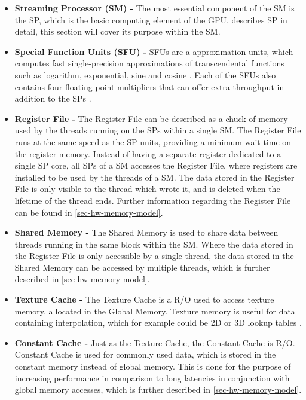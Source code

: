 \begin{itemize}
	\item \textbf{Streaming Processor (SM) -}  The most essential component of the SM is the SP, which is the basic computing element of the GPU.
	 describes SP in detail, this section will cover its purpose within the SM.
	
	\item \textbf{Special Function Units (SFU) -} SFUs are a approximation units, which computes fast single-precision approximations of transcendental functions such as logarithm, exponential, sine and cosine \cite{Wilt2013}.
	Each of the SFUs also contains four floating-point multipliers that can offer extra throughput in addition to the SPs \cite{Li2016}.
	
	\item \textbf{Register File -} The Register File can be described as a chuck of memory used by the threads running on the SPs within a single SM. 
	The Register File runs at the same speed as the SP units, providing a minimum wait time on the register memory. 
	Instead of having a separate register dedicated to a single SP core, all SPs of a SM accesses the Register File, where registers are installed to be used by the threads of a SM.
	The data stored in the Register File is only visible to the thread which wrote it, and is deleted when the lifetime of the thread ends.
	Further information regarding the Register File can be found in \cref{sec-hw-memory-model}.
	
	\item \textbf{Shared Memory -} The Shared Memory is used to share data between threads running in the same block within the SM.
	Where the data stored in the Register File is only accessible by a single thread, the data stored in the Shared Memory can be accessed by multiple threads, which is further described in \cref{sec-hw-memory-model}.
		
	\item \textbf{Texture Cache -} The Texture Cache is a R/O used to access texture memory, allocated in the Global Memory.
	Texture memory is useful for data containing interpolation, which for example could be 2D or 3D lookup tables \cite{Cook2008}.
	
	\item \textbf{Constant Cache -} Just as the Texture Cache, the Constant Cache is R/O.
	Constant Cache is used for commonly used data, which is stored in the constant memory instead of global memory.
	This is done for the purpose of increasing performance in comparison to long latencies in conjunction with global memory accesses, which is further described in \cref{sec-hw-memory-model}.
	

\end{itemize}
